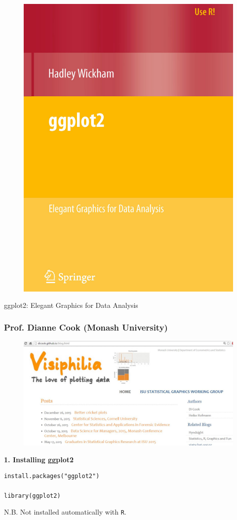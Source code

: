 \documentclass{beamer}
\begin{document}

\begin{frame}
\begin{figure}
\centering
\includegraphics[width=0.55\linewidth]{ggplot2-bookcover}
\end{figure}
ggplot2: Elegant Graphics for Data Analysis
\end{frame}

\begin{frame}
	\frametitle{Prof. Dianne Cook (Monash University)}
\begin{figure}
\centering
\includegraphics[width=1.1\linewidth]{visiphilia}
\end{figure}
\end{frame}



\begin{frame}[fragile]
\textbf{1. Installing ggplot2}
\begin{framed}
\begin{verbatim}
install.packages("ggplot2")

library(ggplot2)
\end{verbatim}
\end{framed}
N.B. Not installed automatically with \texttt{R}.
\end{frame}
\end{document}
